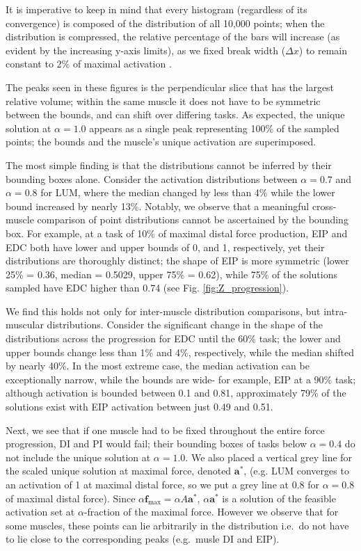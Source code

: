 It is imperative to keep in mind that every histogram (regardless of its convergence) is composed of the distribution of all 10,000 points; when the distribution is compressed, the relative percentage of the bars will increase (as evident by the increasing y-axis limits), as we fixed break width ($\Delta x$) to remain constant to 2\% of maximal activation \cite{ball1997elementary}.

The peaks seen in these figures is the perpendicular slice that has the largest relative volume; within the same muscle it does not have to be symmetric between the bounds, and can shift over differing tasks.
As expected, the unique solution at $\alpha=1.0$ appears as a single peak representing 100\% of the sampled points; the bounds and the muscle's unique activation are superimposed.

The most simple finding is that the distributions cannot be inferred by their bounding boxes alone.
Consider the activation distributions between $\alpha = 0.7$ and $\alpha = 0.8$ for LUM, where the median changed by less than 4\% while the lower bound increased by nearly 13\%.
Notably, we observe that a meaningful cross-muscle comparison of point distributions cannot be ascertained by the bounding box. For example, at a task of 10\% of maximal distal force production, EIP and EDC both have lower and upper bounds of 0, and 1, respectively, yet their distributions are thoroughly distinct; the shape of EIP is more symmetric (lower 25\% = 0.36, median = 0.5029, upper 75\% = 0.62), while 75\% of the solutions sampled have EDC higher than 0.74 (see Fig. \ref{fig:Z_progression}).

We find this holds not only for inter-muscle distribution comparisons, but intra-muscular distributions. Consider the significant change in the shape of the distributions across the progression for EDC until the 60\% task; the lower and upper bounds change less than 1\% and 4\%, respectively, while the median shifted by nearly 40\%.
In the most extreme case, the median activation can be exceptionally narrow, while the bounds are wide- for example, EIP at a 90\% task; although activation is bounded between 0.1 and 0.81, approximately 79\% of the solutions exist with EIP activation between just 0.49 and 0.51.

Next, we see that if one muscle had to be fixed throughout the entire force progression, DI and PI would fail; their bounding boxes of tasks below $\alpha=0.4$ do not include the unique solution at $\alpha=1.0$.
We also placed a vertical grey line for the scaled unique solution at maximal force, denoted $\textbf{a}^*$, (e.g. LUM converges to an activation of 1 at maximal distal force, so we put a grey line at 0.8 for $\alpha=0.8$ of maximal distal force).
Since $\alpha \textbf{f}_{\max} = \alpha A \textbf{a}^*$, $\alpha \textbf{a}^*$ is a solution of the feasible activation set at $\alpha$-fraction of the maximal force.
However we observe that for some muscles, these points can lie arbitrarily in the distribution i.e.\ do not have to lie close to the corresponding peaks (e.g.\ musle DI and EIP).



